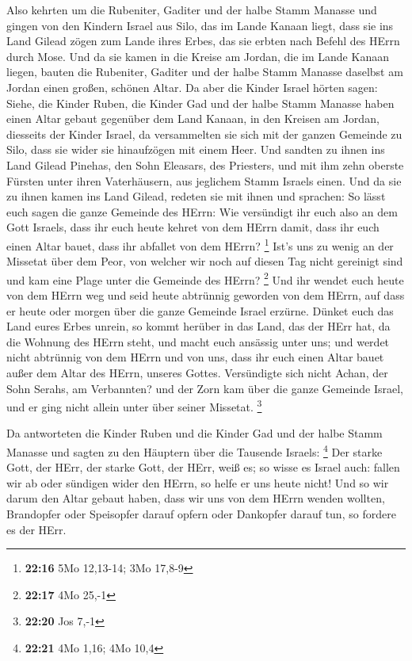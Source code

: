  Also kehrten um die Rubeniter, Gaditer und der halbe Stamm
Manasse und gingen von den Kindern Israel aus Silo, das im Lande Kanaan
liegt, dass sie ins Land Gilead zögen zum Lande ihres Erbes, das sie
erbten nach Befehl des HErrn durch Mose.  Und da sie kamen
in die Kreise am Jordan, die im Lande Kanaan liegen, bauten die
Rubeniter, Gaditer und der halbe Stamm Manasse daselbst am Jordan einen
großen, schönen Altar.  Da aber die Kinder Israel hörten
sagen: Siehe, die Kinder Ruben, die Kinder Gad und der halbe Stamm
Manasse haben einen Altar gebaut gegenüber dem Land Kanaan, in den
Kreisen am Jordan, diesseits der Kinder Israel,  da
versammelten sie sich mit der ganzen Gemeinde zu Silo, dass sie wider
sie hinaufzögen mit einem Heer.  Und sandten zu ihnen ins
Land Gilead Pinehas, den Sohn Eleasars, des Priesters,  und
mit ihm zehn oberste Fürsten unter ihren Vaterhäusern, aus jeglichem
Stamm Israels einen.  Und da sie zu ihnen kamen ins Land
Gilead, redeten sie mit ihnen und sprachen:  So lässt euch
sagen die ganze Gemeinde des HErrn: Wie versündigt ihr euch also an dem
Gott Israels, dass ihr euch heute kehret von dem HErrn damit, dass ihr
euch einen Altar bauet, dass ihr abfallet von dem HErrn? \footnote{\textbf{22:16}
  5Mo 12,13-14; 3Mo 17,8-9}  Ist's uns zu wenig an der
Missetat über dem Peor, von welcher wir noch auf diesen Tag nicht
gereinigt sind und kam eine Plage unter die Gemeinde des HErrn?
\footnote{\textbf{22:17} 4Mo 25,-1}  Und ihr wendet euch
heute von dem HErrn weg und seid heute abtrünnig geworden von dem HErrn,
auf dass er heute oder morgen über die ganze Gemeinde Israel erzürne.
 Dünket euch das Land eures Erbes unrein, so kommt herüber
in das Land, das der HErr hat, da die Wohnung des HErrn steht, und macht
euch ansässig unter uns; und werdet nicht abtrünnig von dem HErrn und
von uns, dass ihr euch einen Altar bauet außer dem Altar des HErrn,
unseres Gottes.  Versündigte sich nicht Achan, der Sohn
Serahs, am Verbannten? und der Zorn kam über die ganze Gemeinde Israel,
und er ging nicht allein unter über seiner Missetat. \footnote{\textbf{22:20}
  Jos 7,-1}

 Da antworteten die Kinder Ruben und die Kinder Gad und der
halbe Stamm Manasse und sagten zu den Häuptern über die Tausende
Israels: \footnote{\textbf{22:21} 4Mo 1,16; 4Mo 10,4}  Der
starke Gott, der HErr, der starke Gott, der HErr, weiß es; so wisse es
Israel auch: fallen wir ab oder sündigen wider den HErrn, so helfe er
uns heute nicht!  Und so wir darum den Altar gebaut haben,
dass wir uns von dem HErrn wenden wollten, Brandopfer oder Speisopfer
darauf opfern oder Dankopfer darauf tun, so fordere es der HErr.

